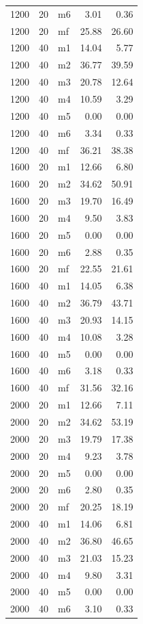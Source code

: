 \documentclass[10pt,a4paper]{article}
\begin{document}
\begin{center}
\begin{longtable}{rrlrr}
1200 & 20 & m6 & 3.01 & 0.36 \\
1200 & 20 & mf & 25.88 & 26.60 \\
1200 & 40 & m1 & 14.04 & 5.77 \\
1200 & 40 & m2 & 36.77 & 39.59 \\
1200 & 40 & m3 & 20.78 & 12.64 \\
1200 & 40 & m4 & 10.59 & 3.29 \\
1200 & 40 & m5 & 0.00 & 0.00 \\
1200 & 40 & m6 & 3.34 & 0.33 \\
1200 & 40 & mf & 36.21 & 38.38 \\
1600 & 20 & m1 & 12.66 & 6.80 \\
1600 & 20 & m2 & 34.62 & 50.91 \\
1600 & 20 & m3 & 19.70 & 16.49 \\
1600 & 20 & m4 & 9.50 & 3.83 \\
1600 & 20 & m5 & 0.00 & 0.00 \\
1600 & 20 & m6 & 2.88 & 0.35 \\
1600 & 20 & mf & 22.55 & 21.61 \\
1600 & 40 & m1 & 14.05 & 6.38 \\
1600 & 40 & m2 & 36.79 & 43.71 \\
1600 & 40 & m3 & 20.93 & 14.15 \\
1600 & 40 & m4 & 10.08 & 3.28 \\
1600 & 40 & m5 & 0.00 & 0.00 \\
1600 & 40 & m6 & 3.18 & 0.33 \\
1600 & 40 & mf & 31.56 & 32.16 \\
2000 & 20 & m1 & 12.66 & 7.11 \\
2000 & 20 & m2 & 34.62 & 53.19 \\
2000 & 20 & m3 & 19.79 & 17.38 \\
2000 & 20 & m4 & 9.23 & 3.78 \\
2000 & 20 & m5 & 0.00 & 0.00 \\
2000 & 20 & m6 & 2.80 & 0.35 \\
2000 & 20 & mf & 20.25 & 18.19 \\
2000 & 40 & m1 & 14.06 & 6.81 \\
2000 & 40 & m2 & 36.80 & 46.65 \\
2000 & 40 & m3 & 21.03 & 15.23 \\
2000 & 40 & m4 & 9.80 & 3.31 \\
2000 & 40 & m5 & 0.00 & 0.00 \\
2000 & 40 & m6 & 3.10 & 0.33 \\

\end{longtable}
\end{center}
\end{document}
